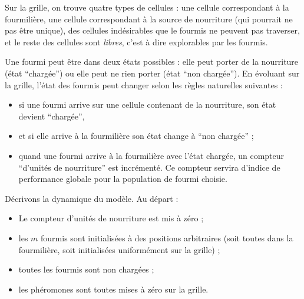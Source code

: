 \documentclass[a4]{article}
\begin{document}
Sur la grille, on trouve quatre types de cellules : une cellule correspondant à la fourmilière, une cellule correspondant à la source de
nourriture (qui pourrait ne pas être unique), des cellules indésirables que le fourmis ne peuvent pas traverser, et le reste des
cellules sont \textsl{libres}, c'est à dire explorables par les fourmis.

Une fourmi peut être dans deux états possibles : elle peut porter de la nourriture (état ``chargée'') ou elle peut ne rien porter (état ``non chargée''). En évoluant sur la grille, l'état des fourmis peut changer selon les règles naturelles suivantes :
\begin{itemize}
\item si une fourmi arrive sur une cellule contenant de la nourriture, son état devient ``chargée'',
\item et si elle arrive à la fourmilière son état change à ``non chargée'' ;
\item quand une fourmi arrive à la fourmilière avec l'état chargée, un compteur ``d'unités de nourriture'' est incrémenté.
Ce compteur servira d'indice de performance globale pour la population de fourmi choisie.
\end{itemize}

Décrivons la dynamique du modèle. Au départ :
\begin{itemize}
\item Le compteur d'unités de nourriture est mis à zéro ;
\item les $m$ fourmis sont initialisées à des positions arbitraires
  (soit toutes dans la fourmilière, soit initialisées uniformément sur la grille) ;
\item toutes les fourmis sont non chargées ;
\item les phéromones sont toutes mises à zéro sur la grille.
\end{itemize}
\end{document}
